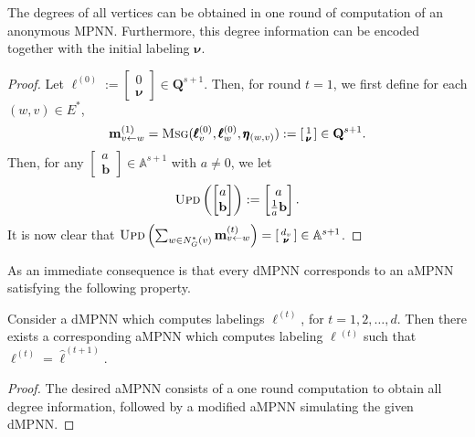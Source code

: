 \begin{lemma}
	The degrees of all vertices can be obtained in one round of computation of an anonymous MPNN. Furthermore, this degree information can be encoded together with the initial labeling $\pmb{\nu}$.
	\end{lemma}
\begin{proof}
Let $\pmb{\ell}^{(0)}:=\left[\begin{smallmatrix}0\\\pmb{\nu}\end{smallmatrix}\right]\in\mathbf{Q}^{s+1}$. Then, for round $t=1$, we first define for each $(w,v)\in E^*$, 
$$\mathbf{m}^{(1)}_{v\gets w}=\textsc{Msg}(\pmb{\ell}^{(0)}_v,\pmb{\ell}^{(0)}_{w},\pmb{\eta}_{(w,v)}):=\left[\begin{smallmatrix}1\\\pmb{\nu}\end{smallmatrix}\right]\in\mathbf{Q}^{s+1}.$$ Then, for any
$\left[\begin{smallmatrix} a\\\mathbf{b}\end{smallmatrix}\right]\in \mathbb{A}^{s+1}$ with $a\neq 0$, we 
let 
$$\textsc{Upd}\left(\begin{bmatrix} a\\\mathbf{b}\end{bmatrix}\right):=\begin{bmatrix} a\\\frac{1}{a}\mathbf{b}\end{bmatrix}.
$$
It is now clear that $\textsc{Upd}\left(\sum_{w\in N_G^*(v)}\mathbf{m}_{v\gets w}^{(t)}\right)=\left[\begin{smallmatrix} d_v\\\pmb{\nu}\end{smallmatrix}\right]\in \mathbb{A}^{s+1}$.
\end{proof}

As an immediate consequence is that every dMPNN corresponds to an aMPNN satisfying the following property.
\begin{proposition}\label{prop:onestep}
Consider a dMPNN which computes labelings $\pmb{\ell}^{(t)}$, for $t=1,2,\ldots,d$. Then there exists a corresponding aMPNN which computes labeling $\hat{\pmb{\ell}}{}^{(t)}$ such that $\pmb{\ell}^{(t)}=\hat{\pmb{\ell}}^{(t+1)}$.
\end{proposition}
\begin{proof}
	The desired aMPNN consists of a one round computation to obtain all degree information, followed by a modified aMPNN simulating the given dMPNN.
\end{proof}

